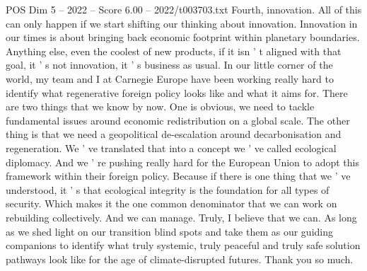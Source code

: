 \begin{textsample}{POS Dim 5 – 2022 – Score 6.00 – 2022/t003703.txt}
Fourth, innovation.
All of this can only happen if we start shifting our thinking about innovation.
Innovation in our times is about bringing back economic footprint within planetary boundaries.
Anything else, even the coolest of new products, if it isn ' t aligned with that goal, it ' s not innovation, it ' s business as usual.
In our little corner of the world, my team and I at Carnegie Europe have been working really hard to identify what regenerative foreign policy looks like and what it aims for.
There are two things that we know by now.
One is obvious, we need to tackle fundamental issues around economic redistribution on a global scale.
The other thing is that we need a geopolitical de-escalation around decarbonisation and regeneration.
We ' ve translated that into a concept we ' ve called ecological diplomacy.
And we ' re pushing really hard for the European Union to adopt this framework within their foreign policy.
Because if there is one thing that we ' ve understood, it ' s that ecological integrity is the foundation for all types of security.
Which makes it the one common denominator that we can work on rebuilding collectively.
And we can manage.
Truly, I believe that we can.
As long as we shed light on our transition blind spots and take them as our guiding companions to identify what truly systemic, truly peaceful and truly safe solution pathways look like for the age of climate-disrupted futures.
Thank you so much.

\end{textsample}
